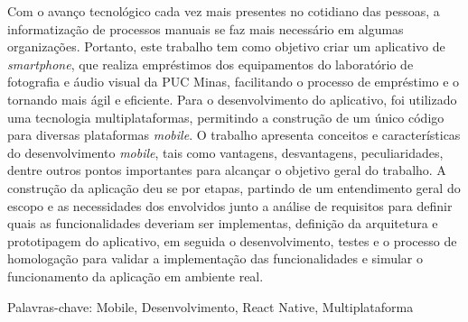 \begin{resumo}
\vspace{-1cm}

\onehalfspacing

\noindent 
  Com o avanço tecnológico cada vez mais presentes no cotidiano das pessoas, a informatização de processos manuais se faz mais necessário em algumas organizações. Portanto, este trabalho tem como objetivo criar um aplicativo de \textit{smartphone}, que realiza empréstimos dos equipamentos do laboratório de fotografia e áudio visual da PUC Minas, facilitando o processo de empréstimo e o tornando mais ágil e eficiente. Para o desenvolvimento do aplicativo, foi utilizado uma tecnologia multiplataformas, permitindo a construção de um único código para diversas plataformas \textit{mobile}. O trabalho apresenta conceitos e características do desenvolvimento \textit{mobile}, tais como vantagens, desvantagens, peculiaridades, dentre outros pontos importantes para alcançar o objetivo geral do trabalho. A construção da aplicação deu se por etapas, partindo de um entendimento geral do escopo e as necessidades dos envolvidos junto a análise de requisitos para definir quais as funcionalidades deveriam ser implementas, definição da arquitetura e prototipagem do aplicativo, em seguida o desenvolvimento, testes e o processo de homologação para validar a implementação das funcionalidades e simular o funcionamento da aplicação em ambiente real.

\vspace*{.75cm}

\noindent Palavras-chave: Mobile, Desenvolvimento, React Native, Multiplataforma

\end{resumo}